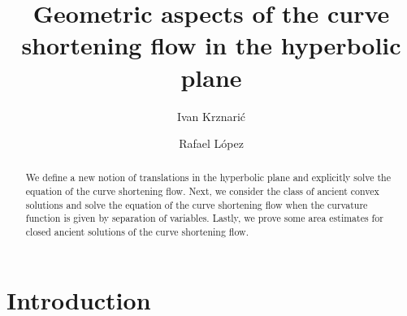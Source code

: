 \documentclass[12pt]{amsart}
\theoremstyle{plain}
\theoremstyle{definition}
\begin{document}
\title[Curve shortening flow in the hyperbolic plane]{Geometric aspects of the curve shortening flow in the hyperbolic plane }
\author{Ivan Krznari\'{c}}
\address{Faculty of Economics and Business. University of Zagreb, Trg John F. Kennedy 6, 10 000 Zagreb, Croatia}
\author{Rafael L\'opez}
\address{Departamento de Geometr\'{\i}a y Topolog\'{\i}a Universidad de Granada 18071 Granada, Spain}


\begin{abstract}
We define a new notion of translations in the hyperbolic plane and explicitly solve the equation of the curve shortening flow. Next, we consider the class of ancient convex solutions and solve the equation of the curve shortening flow when the curvature function is given by separation of variables. Lastly, we prove some area estimates for closed ancient solutions of the curve shortening flow. 
\end{abstract}

\maketitle

 \section{Introduction}
 
\end{document}
